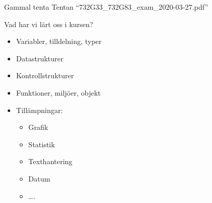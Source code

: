 \documentclass[
  11pt,
  ignorenonframetext,
  handout]{beamer}
\providecommand{\tightlist}{%
  \setlength{\itemsep}{0pt}\setlength{\parskip}{0pt}}
\begin{document}
\begin{frame}{Gammal tenta}
\protect\hypertarget{gammal-tenta}{}
Tentan ``732G33\_732G83\_exam\_2020-03-27.pdf''

Vad har vi lärt oss i kursen?

\begin{itemize}
\tightlist
\item
  Variabler, tilldelning, typer
\item
  Datastrukturer
\item
  Kontrollstrukturer
\item
  Funktioner, miljöer, objekt
\item
  Tillämpningar:

  \begin{itemize}
  \tightlist
  \item
    Grafik
  \item
    Statistik
  \item
    Texthantering
  \item
    Datum
  \item
    \ldots.
  \end{itemize}
\end{itemize}
\end{frame}
\end{document}
